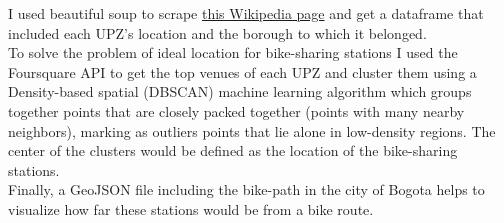 \documentclass[11pt]{article}
\begin{document}
I used beautiful soup to scrape \href{https://es.wikipedia.org/wiki/Unidades_de_Planeamiento_Zonal}{this Wikipedia page} and get a dataframe that included each UPZ’s location and the borough to which it belonged. \\

To solve the problem of ideal location for bike-sharing stations I used the Foursquare API to get the top venues of each UPZ and cluster them using a Density-based spatial (DBSCAN) machine learning algorithm which groups together points that are closely packed together (points with many nearby neighbors), marking as outliers points that lie alone in low-density regions. The center of the clusters would be defined as the location of the bike-sharing stations. \\

Finally, a GeoJSON file including the bike-path in the city of Bogota helps to visualize how far these stations would be from a bike route.
\end{document}
